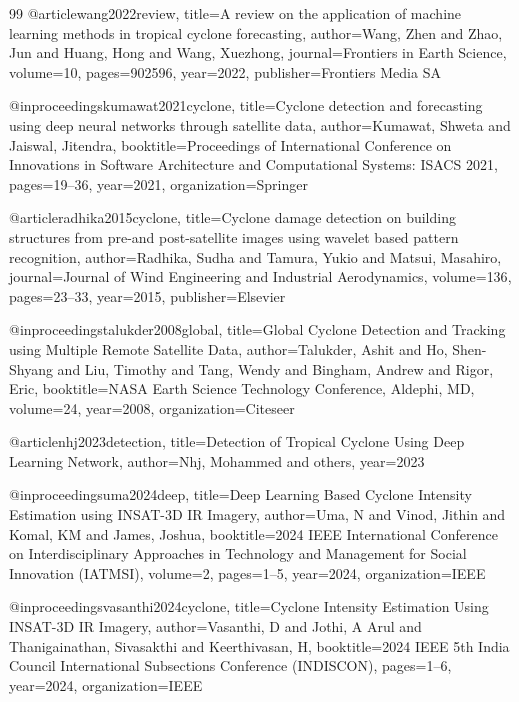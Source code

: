 \begin{thebibliography}{99}
@article{wang2022review,
  title={A review on the application of machine learning methods in tropical cyclone forecasting},
  author={Wang, Zhen and Zhao, Jun and Huang, Hong and Wang, Xuezhong},
  journal={Frontiers in Earth Science},
  volume={10},
  pages={902596},
  year={2022},
  publisher={Frontiers Media SA}
}

@inproceedings{kumawat2021cyclone,
  title={Cyclone detection and forecasting using deep neural networks through satellite data},
  author={Kumawat, Shweta and Jaiswal, Jitendra},
  booktitle={Proceedings of International Conference on Innovations in Software Architecture and Computational Systems: ISACS 2021},
  pages={19--36},
  year={2021},
  organization={Springer}
}

@article{radhika2015cyclone,
  title={Cyclone damage detection on building structures from pre-and post-satellite images using wavelet based pattern recognition},
  author={Radhika, Sudha and Tamura, Yukio and Matsui, Masahiro},
  journal={Journal of Wind Engineering and Industrial Aerodynamics},
  volume={136},
  pages={23--33},
  year={2015},
  publisher={Elsevier}
}

@inproceedings{talukder2008global,
  title={Global Cyclone Detection and Tracking using Multiple Remote Satellite Data},
  author={Talukder, Ashit and Ho, Shen-Shyang and Liu, Timothy and Tang, Wendy and Bingham, Andrew and Rigor, Eric},
  booktitle={NASA Earth Science Technology Conference, Aldephi, MD},
  volume={24},
  year={2008},
  organization={Citeseer}
}

@article{nhj2023detection,
  title={Detection of Tropical Cyclone Using Deep Learning Network},
  author={Nhj, Mohammed and others},
  year={2023}
}

@inproceedings{uma2024deep,
  title={Deep Learning Based Cyclone Intensity Estimation using INSAT-3D IR Imagery},
  author={Uma, N and Vinod, Jithin and Komal, KM and James, Joshua},
  booktitle={2024 IEEE International Conference on Interdisciplinary Approaches in Technology and Management for Social Innovation (IATMSI)},
  volume={2},
  pages={1--5},
  year={2024},
  organization={IEEE}
}

@inproceedings{vasanthi2024cyclone,
  title={Cyclone Intensity Estimation Using INSAT-3D IR Imagery},
  author={Vasanthi, D and Jothi, A Arul and Thanigainathan, Sivasakthi and Keerthivasan, H},
  booktitle={2024 IEEE 5th India Council International Subsections Conference (INDISCON)},
  pages={1--6},
  year={2024},
  organization={IEEE}
}


\end{thebibliography}
